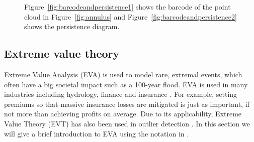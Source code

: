 \documentclass[letter,12pt]{article}
\begin{document}
\begin{figure}[!ht]
    \centering
	\caption{ Figure~\ref{fig:barcodeandpersistence1} shows the barcode of the point cloud in Figure~\ref{fig:annulus} and Figure~\ref{fig:barcodeandpersistence2} shows the persistence diagram. }
  \label{fig:barcodeandpersistence} 
\end{figure}


\subsection{Extreme value theory}\label{subsec:evt}
Extreme Value Analysis (EVA) is used to model rare, extremal events, which often have a big societal impact such as a 100-year flood. EVA is used in many industries including hydrology, finance and insurance \citep{Reiss2001}. For example, setting premiums so that massive insurance losses are mitigated is just as important, if not more than achieving profits on average. Due to its applicability, Extreme Value Theory (EVT) has also been used in outlier detection \citep{wilkinson2017visualizing, talagala2019anomaly}. In this section we will give a brief introduction to EVA using the notation in  \cite{coles2001introduction}. 
\end{document}
